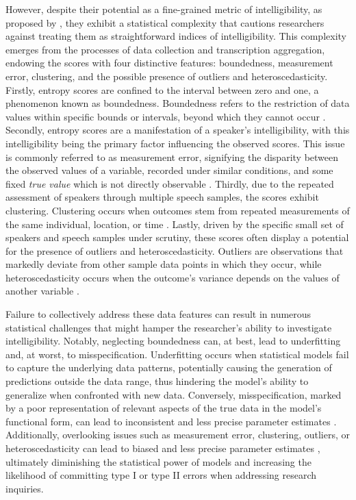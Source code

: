 \documentclass[
  authoryear,
  preprint,
  1p]{elsarticle}
\begin{document}
However, despite their potential as a fine-grained metric of
intelligibility, as proposed by \citet{Boonen_et_al_2021}, they exhibit
a statistical complexity that cautions researchers against treating them
as straightforward indices of intelligibility. This complexity emerges
from the processes of data collection and transcription aggregation,
endowing the scores with four distinctive features: boundedness,
measurement error, clustering, and the possible presence of outliers and
heteroscedasticity. Firstly, entropy scores are confined to the interval
between zero and one, a phenomenon known as boundedness. Boundedness
refers to the restriction of data values within specific bounds or
intervals, beyond which they cannot occur \citep{Lebl_2022}. Secondly,
entropy scores are a manifestation of a speaker's intelligibility, with
this intelligibility being the primary factor influencing the observed
scores. This issue is commonly referred to as measurement error,
signifying the disparity between the observed values of a variable,
recorded under similar conditions, and some fixed \emph{true value}
which is not directly observable \citep{Everitt_et_al_2010}. Thirdly,
due to the repeated assessment of speakers through multiple speech
samples, the scores exhibit clustering. Clustering occurs when outcomes
stem from repeated measurements of the same individual, location, or
time \citep{McElreath_2020}. Lastly, driven by the specific small set of
speakers and speech samples under scrutiny, these scores often display a
potential for the presence of outliers and heteroscedasticity. Outliers
are observations that markedly deviate from other sample data points in
which they occur, while heteroscedasticity occurs when the outcome's
variance depends on the values of another variable
\citep{Everitt_et_al_2010}.

Failure to collectively address these data features can result in
numerous statistical challenges that might hamper the researcher's
ability to investigate intelligibility. Notably, neglecting boundedness
can, at best, lead to underfitting and, at worst, to misspecification.
Underfitting occurs when statistical models fail to capture the
underlying data patterns, potentially causing the generation of
predictions outside the data range, thus hindering the model's ability
to generalize when confronted with new data. Conversely,
misspecification, marked by a poor representation of relevant aspects of
the true data in the model's functional form, can lead to inconsistent
and less precise parameter estimates \citep{Everitt_et_al_2010}.
Additionally, overlooking issues such as measurement error, clustering,
outliers, or heteroscedasticity can lead to biased and less precise
parameter estimates \citep{McElreath_2020}, ultimately diminishing the
statistical power of models and increasing the likelihood of committing
type I or type II errors when addressing research inquiries.
\end{document}
